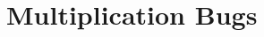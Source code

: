 \chapter[Multiplication bugs]{Multiplication Bugs}\label{c:xa}

\begin{singlespace}

\end{singlespace}
